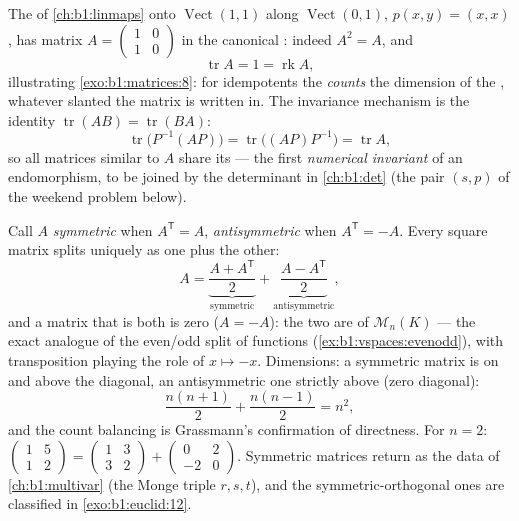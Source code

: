 \begin{example}
\label{ex:b1:matrices:tracework}
The  of \cref{ch:b1:linmaps} onto
$\operatorname{Vect}(1,1)$ along $\operatorname{Vect}(0,1)$,
$p(x, y) = (x, x)$, has matrix $A = \begin{pmatrix} 1 & 0\\ 1 &
0\end{pmatrix}$ in the canonical : indeed $A^2 = A$, and
\[
\operatorname{tr} A = 1 = \operatorname{rk} A ,
\]
illustrating \cref{exo:b1:matrices:8}: for idempotents the 
\emph{counts} the dimension of the , whatever slanted 
the matrix is written in. The invariance mechanism is the
identity $\operatorname{tr}(AB) = \operatorname{tr}(BA)$:
\[
\operatorname{tr}\bigl(P^{-1}(AP)\bigr) =
\operatorname{tr}\bigl((AP)P^{-1}\bigr) = \operatorname{tr} A ,
\]
so all matrices similar to $A$ share its  --- the first
\emph{numerical invariant} of an endomorphism, to be joined by
the determinant in \cref{ch:b1:det} (the pair $(s, p)$ of the
weekend problem below).
\end{example}

\begin{example}
\label{ex:b1:matrices:symsplit}
Call $A$ \emph{symmetric} when $A^{\mathsf T} = A$,
\emph{antisymmetric} when $A^{\mathsf T} = -A$. Every square
matrix splits uniquely as one plus the other:
\[
A = \underbrace{\frac{A + A^{\mathsf T}}{2}}_{\text{symmetric}}
+ \underbrace{\frac{A - A^{\mathsf T}}{2}}_{\text{antisymmetric}},
\]
and a matrix that is both is zero ($A = -A$): the two  are
 of $\mathcal{M}_n(K)$ --- the exact
analogue of the even/odd split of functions
(\cref{ex:b1:vspaces:evenodd}), with transposition playing the
role of $x \mapsto -x$. Dimensions: a symmetric matrix is 
on and above the diagonal, an antisymmetric one strictly above
(zero diagonal):
\[
\frac{n(n+1)}{2} + \frac{n(n-1)}{2} = n^2 ,
\]
and the count balancing is Grassmann's confirmation of
directness. For $n = 2$: $\begin{pmatrix} 1 & 5\\ 1 &
2\end{pmatrix} = \begin{pmatrix} 1 & 3\\ 3 & 2\end{pmatrix} +
\begin{pmatrix} 0 & 2\\ -2 & 0\end{pmatrix}$. Symmetric
matrices return as the  data of
\cref{ch:b1:multivar} (the Monge triple $r, s, t$), and the
symmetric-orthogonal ones are classified in
\cref{exo:b1:euclid:12}.
\end{example}

